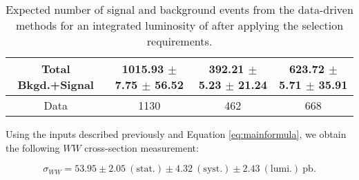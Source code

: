 \begin{table}[ht!]
\begin{center}
\begin{tabular} {|c|c|c|c|}
Total Bkgd.+Signal    & 1015.93 $\pm$ 7.75 $\pm$ 56.52   & 392.21 $\pm$ 5.23 $\pm$ 21.24   & 623.72 $\pm$ 5.71 $\pm$ 35.91 \\ \hline \hline
Data                  & 1130                             & 462                             & 668 \\ \hline
\end{tabular}
  \caption{Expected number of signal and background events from the data-driven methods for
  an integrated luminosity of \intlumi after applying the selection requirements.}
   \label{tab:data_yields}
  \end{center}
\end{table}

Using the inputs described previously and Equation \ref{eq:mainformula},
we obtain the following $WW$ cross-section measurement:

\begin{equation*}
\sigma_{WW}  = 53.95 \pm 2.05~\mathrm{(stat.)} \pm 4.32~\mathrm{(syst.)} \pm 2.43~\mathrm{(lumi.)~pb}.
\end{equation*}

